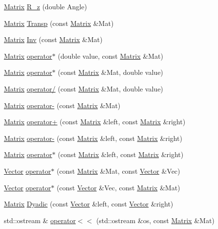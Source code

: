 \begin{DoxyCompactItemize}
\hyperlink{classMatrix}{Matrix} \hyperlink{classMatrix_a94c9c4e1f3afc6636dda6572f72ef4c2}{R\-\_\-z} (double Angle)
\item 
\hyperlink{classMatrix}{Matrix} \hyperlink{classMatrix_aa54829a0c63c78e6bfbd12285ad94075}{Transp} (const \hyperlink{classMatrix}{Matrix} \&Mat)
\item 
\hyperlink{classMatrix}{Matrix} \hyperlink{classMatrix_a5bdf67234eadeb0a304f11d4537047aa}{Inv} (const \hyperlink{classMatrix}{Matrix} \&Mat)
\item 
\hyperlink{classMatrix}{Matrix} \hyperlink{classMatrix_a268bff5a8ac028eb9ef9671f2a4185db}{operator$\ast$} (double value, const \hyperlink{classMatrix}{Matrix} \&Mat)
\item 
\hyperlink{classMatrix}{Matrix} \hyperlink{classMatrix_a7e0731e101b2ddd82e506e09394962e9}{operator$\ast$} (const \hyperlink{classMatrix}{Matrix} \&Mat, double value)
\item 
\hyperlink{classMatrix}{Matrix} \hyperlink{classMatrix_a204b6db43c7ea7ff6f15e927d25c1c3c}{operator/} (const \hyperlink{classMatrix}{Matrix} \&Mat, double value)
\item 
\hyperlink{classMatrix}{Matrix} \hyperlink{classMatrix_a443e399b244090d5d912a25e488874c2}{operator-\/} (const \hyperlink{classMatrix}{Matrix} \&Mat)
\item 
\hyperlink{classMatrix}{Matrix} \hyperlink{classMatrix_ac82b2ffb982879784a901be332961065}{operator+} (const \hyperlink{classMatrix}{Matrix} \&left, const \hyperlink{classMatrix}{Matrix} \&right)
\item 
\hyperlink{classMatrix}{Matrix} \hyperlink{classMatrix_a617ecec648cf992c05346391108ddae3}{operator-\/} (const \hyperlink{classMatrix}{Matrix} \&left, const \hyperlink{classMatrix}{Matrix} \&right)
\item 
\hyperlink{classMatrix}{Matrix} \hyperlink{classMatrix_a6b58c286243be002bf669704ad15353a}{operator$\ast$} (const \hyperlink{classMatrix}{Matrix} \&left, const \hyperlink{classMatrix}{Matrix} \&right)
\item 
\hyperlink{classVector}{Vector} \hyperlink{classMatrix_ad239de62f336223aebc6a42debc44883}{operator$\ast$} (const \hyperlink{classMatrix}{Matrix} \&Mat, const \hyperlink{classVector}{Vector} \&Vec)
\item 
\hyperlink{classVector}{Vector} \hyperlink{classMatrix_adf558aeff97481fccb373a50dcba1c2d}{operator$\ast$} (const \hyperlink{classVector}{Vector} \&Vec, const \hyperlink{classMatrix}{Matrix} \&Mat)
\item 
\hyperlink{classMatrix}{Matrix} \hyperlink{classMatrix_a4c5b7e42a648b06a906407b0155e3342}{Dyadic} (const \hyperlink{classVector}{Vector} \&left, const \hyperlink{classVector}{Vector} \&right)
\item 
std\-::ostream \& \hyperlink{classMatrix_af4c0397ea9493076522e569cacddb99f}{operator$<$$<$} (std\-::ostream \&os, const \hyperlink{classMatrix}{Matrix} \&Mat)
\end{DoxyCompactItemize}


